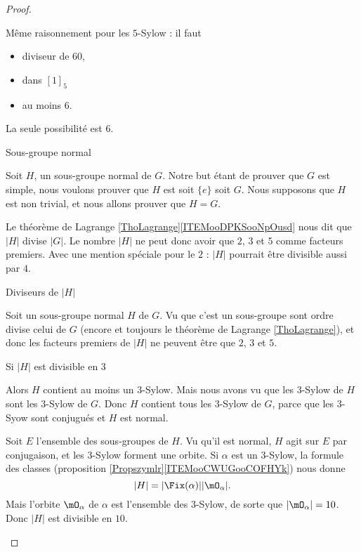\begin{proof}
\begin{subproof}
                Même raisonnement pour les \( 5\)-Sylow : il faut
                \begin{itemize}
                    \item diviseur de \( 60\),
                    \item dans \( [1]_5\)
                    \item au moins \( 6\).
                \end{itemize}
                La seule possibilité est \( 6\).
                
            \item[Sous-groupe normal]

                Soit \( H\), un sous-groupe normal de \( G\). Notre but étant de prouver que \( G\) est simple, nous voulons prouver que \( H\) est soit \( \{ e \}\) soit \( G\). Nous supposons que \( H\) est non trivial, et nous allons prouver que \( H=G\).

                Le théorème de Lagrange \ref{ThoLagrange}\ref{ITEMooDPKSooNpOusd} nous dit que \( | H |\) divise \( | G |\). Le nombre \( | H |\) ne peut donc avoir que \( 2\), \( 3\) et \( 5\) comme facteurs premiers. Avec une mention spéciale pour le \( 2\) : \( | H |\) pourrait être divisible aussi par \( 4\).

            \item[Diviseurs de \( | H |\)]

                Soit un sous-groupe normal \( H\) de \( G\). Vu que c'est un sous-groupe sont ordre divise celui de \( G\) (encore et toujours le théorème de Lagrange \ref{ThoLagrange}), et donc les facteurs premiers de \( | H |\) ne peuvent être que \( 2\), \( 3\) et \( 5\).

            \item[Si \( | H |\) est divisible en \( 3\)]

                Alors \( H\) contient au moins un \( 3\)-Sylow. Mais nous avons vu que les \( 3\)-Sylow de \( H\) sont les \( 3\)-Sylow de \( G\). Donc \( H\) contient tous les \( 3\)-Sylow de \( G\), parce que les \( 3\)-Syow sont conjugués et \( H\) est normal.

                Soit \( E\) l'ensemble des sous-groupes de \( H\). Vu qu'il est normal, \( H\) agit sur \( E\) par conjugaison, et les \( 3\)-Sylow forment une orbite. Si \( \alpha\) est un \( 3\)-Sylow, la formule des classes (proposition \ref{Propszymlr}\ref{ITEMooCWUGooCOFHYk}) nous donne
                \begin{equation}
                    | H |=| \Fix(\alpha) | |\mO_{\alpha} |.
                \end{equation}
                Mais l'orbite \( \mO_{\alpha}\) de \( \alpha\) est l'ensemble des \( 3\)-Sylow, de sorte que \( | \mO_{\alpha} |=10\). Donc \( | H |\) est divisible en \( 10\).


\end{subproof}
\end{proof}

